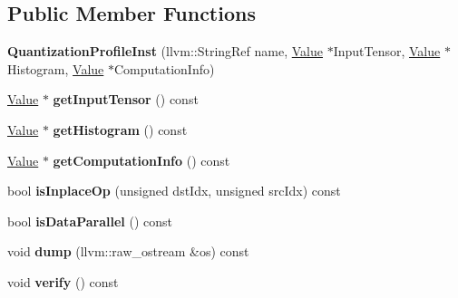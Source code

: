 \subsection*{Public Member Functions}
\begin{DoxyCompactItemize}
\item 
\mbox{\label{classglow_1_1_quantization_profile_inst_a772a60ff126fc3d7bf9a110972d53688}} 
{\bfseries Quantization\+Profile\+Inst} (llvm\+::\+String\+Ref name, \hyperlink{classglow_1_1_value}{Value} $\ast$Input\+Tensor, \hyperlink{classglow_1_1_value}{Value} $\ast$Histogram, \hyperlink{classglow_1_1_value}{Value} $\ast$Computation\+Info)
\item 
\mbox{\label{classglow_1_1_quantization_profile_inst_a0d778b4ef76f220d37a33944f23ad7d2}} 
\hyperlink{classglow_1_1_value}{Value} $\ast$ {\bfseries get\+Input\+Tensor} () const
\item 
\mbox{\label{classglow_1_1_quantization_profile_inst_a738adde46a80e61da79131e0d3c00b0a}} 
\hyperlink{classglow_1_1_value}{Value} $\ast$ {\bfseries get\+Histogram} () const
\item 
\mbox{\label{classglow_1_1_quantization_profile_inst_a6f378ad14072be8dd9fb07cb779275ad}} 
\hyperlink{classglow_1_1_value}{Value} $\ast$ {\bfseries get\+Computation\+Info} () const
\item 
\mbox{\label{classglow_1_1_quantization_profile_inst_ad821a23c5e7c3fab40bc132de4dbc7ed}} 
bool {\bfseries is\+Inplace\+Op} (unsigned dst\+Idx, unsigned src\+Idx) const
\item 
\mbox{\label{classglow_1_1_quantization_profile_inst_ac2542b566019721c39eca4e42e7391a3}} 
bool {\bfseries is\+Data\+Parallel} () const
\item 
\mbox{\label{classglow_1_1_quantization_profile_inst_a7eb778fabdbae4b12d6043822e099528}} 
void {\bfseries dump} (llvm\+::raw\+\_\+ostream \&os) const
\item 
\mbox{\label{classglow_1_1_quantization_profile_inst_ab41ae7838abfa1ce72909d2f9b7701dc}} 
void {\bfseries verify} () const
\end{DoxyCompactItemize}
